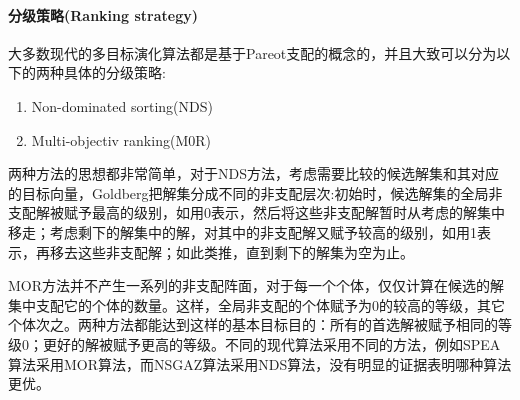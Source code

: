             \paragraph{分级策略(Ranking strategy)}大多数现代的多目标演化算法都是基于Pareot支配的概念的，并且大致可以分为以下的两种具体的分级策略:
            \begin{enumerate}
            \item Non-dominated sorting(NDS)
            \item Multi-objectiv ranking(M0R)
            \end{enumerate}
            \par
            两种方法的思想都非常简单，对于NDS方法，考虑需要比较的候选解集和其对应的目标向量，Goldberg把解集分成不同的非支配层次:初始时，候选解集的全局非支配解被赋予最高的级别，如用0表示，然后将这些非支配解暂时从考虑的解集中移走；考虑剩下的解集中的解，对其中的非支配解又赋予较高的级别，如用1表示，再移去这些非支配解；如此类推，直到剩下的解集为空为止。
            \par
            MOR方法并不产生一系列的非支配阵面，对于每一个个体，仅仅计算在候选的解集中支配它的个体的数量。这样，全局非支配的个体赋予为0的较高的等级，其它个体次之。两种方法都能达到这样的基本目标目的：所有的首选解被赋予相同的等级0；更好的解被赋予更高的等级。不同的现代算法采用不同的方法，例如SPEA算法采用MOR算法，而NSGAZ算法采用NDS算法，没有明显的证据表明哪种算法更优。
